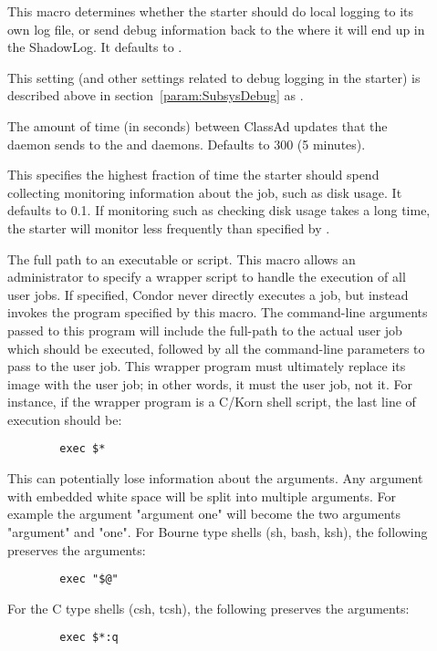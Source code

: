 \begin{description}
\item[]
  \label{param:StarterLocalLogging} This macro determines whether the
  starter should do local logging to its own log file, or send debug
  information back to the  where it will end up in the
  ShadowLog.  It defaults to .

\item[] \label{param:StarterDebug} This setting
  (and other settings related to debug logging in the starter) is
  described above in section~\ref{param:SubsysDebug} as
  .

\item[] \label{param:StarterUpdateInterval}
The amount of time (in seconds) between ClassAd updates that the
 daemon sends to the  and 
daemons.  Defaults to 300 (5 minutes).

\item[]
\label{param:StarterUpdateIntervalTimeslice} This specifies the
highest fraction of time the starter should spend collecting
monitoring information about the job, such as disk usage.  It defaults
to 0.1.  If monitoring such as checking disk usage takes a long time,
the starter will monitor less frequently than specified by
.

\item[] \label{param:UserJobWrapper} 
  The full path to an executable or script.
  This macro
  allows an administrator to specify a wrapper script to handle the
  execution of all user jobs.  
  If specified, Condor never directly executes a job, but instead
  invokes the program specified by this macro.
  The command-line arguments passed to this program will include the
  full-path to the actual user job which should be executed, followed by all
  the command-line parameters to pass to the user job.
  This wrapper program must ultimately replace its image with the user job;
  in other words,
  it must  the user job, not  it.
  For instance, if the wrapper program is a C/Korn shell script, the
  last line of execution should be:
\begin{verbatim}
        exec $*
\end{verbatim}
  This can potentially lose information about the arguments.
  Any argument with embedded white space will be split into multiple
  arguments.
  For example the argument "argument one" will become the two arguments
  "argument" and "one".
  For Bourne type shells (sh, bash, ksh),
  the following preserves the arguments:
\begin{verbatim}
        exec "$@"
\end{verbatim}
  For the C type shells (csh, tcsh), the following preserves the
  arguments:
\begin{verbatim}
        exec $*:q
\end{verbatim}



\end{description}
